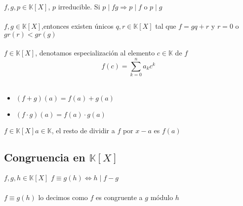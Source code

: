 \documentclass[a4paper,10pt]{article}
\begin{document}
\propiedad $f,g,p \in \mathbb{K}[X]$, $p$ irreducible. Si $p \mid fg \Rightarrow p \mid f$ o $p \mid g$ \\ \\

 $f,g \in \mathbb{K}[X]$,entonces existen únicos $q,r \in \mathbb{K}[X]$ tal que $f=gq+r$ y $r = 0$ o $gr(r) < gr(g)$ \\ \\

 $f \in \mathbb{K}[X]$, denotamos especialización al elemento $c \in \mathbb{K}$ de $f$
$$ f(c) = \sum_{k=0}^{n} {a_k c^{k}} $$ \\ 

\propiedades
\begin{itemize}
	\item $(f+g)(a) = f(a)+g(a)$
	\item $(f \cdot g)(a) = f(a) \cdot g(a)$
\end{itemize}

\teorema $f \in \mathbb{K}[X] a \in \mathbb{K}$, el resto de dividir a $f$ por $x-a$ es $f(a)$


\subsection{Congruencia en $\mathbb{K}[X]$}


 $f,g,h \in \mathbb{K}[X]$ $f \equiv g (h) \Leftrightarrow h \mid f - g$ \\ \\

\notacion $f \equiv g (h)$ lo decimos como $f$ es congruente a $g$ módulo $h$ \\ \\
\end{document}
